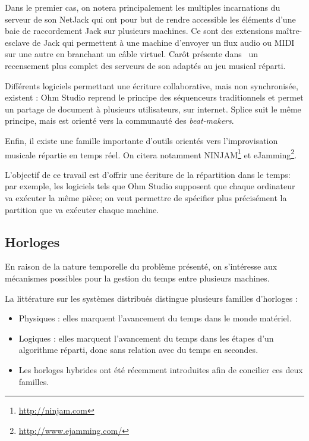 \documentclass[10pt]{article}
\begin{document}
Dans le premier cas, on notera principalement les multiples incarnations du serveur de son NetJack\cite{carot2009netjack} qui ont pour but de rendre accessible les éléments d'une baie de raccordement Jack sur plusieurs machines. 
Ce sont des extensions maître-esclave de Jack qui permettent à une machine d'envoyer un flux audio ou MIDI sur une autre en branchant un câble virtuel.
Carôt présente dans~\cite{carot2007networked} un recensement plus complet des serveurs de son adaptés au jeu musical réparti.

Différents logiciels permettant une écriture collaborative, mais non synchronisée, existent : 
Ohm Studio\cite{koszolko2015crowdsourcing} reprend le principe des séquenceurs traditionnels et permet un partage de document à plusieurs utilisateurs, sur internet.
Splice\cite{pignato2015deterritorialized} suit le même principe, mais est orienté vers la communauté des \emph{beat-makers}.

Enfin, il existe une famille importante d'outils orientés vers l'improvisation musicale répartie en temps réel\cite{mills2010dislocated}. 
On citera notamment NINJAM\footnote{\url{http://ninjam.com}} et eJamming\footnote{\url{http://www.ejamming.com/}}.

L'objectif de ce travail est d'offrir une écriture de la répartition dans le temps: par exemple, les logiciels tels que Ohm Studio supposent 
que chaque ordinateur va exécuter la même pièce; on veut permettre de spécifier plus précisément la partition que va exécuter chaque machine. 

\subsection{Horloges}
En raison de la nature temporelle du problème présenté, on s'intéresse aux mécanismes possibles pour la gestion du temps entre plusieurs machines.

La littérature sur les systèmes distribués distingue plusieurs familles d'horloges : 
\begin{itemize}
    \item Physiques : elles marquent l'avancement du temps dans le monde matériel.
    \item Logiques : elles marquent l'avancement du temps dans les étapes d'un algorithme réparti, donc sans relation avec du temps en secondes.
    \item Les horloges hybrides ont été récemment introduites afin de concilier ces deux familles.
\end{itemize}
\end{document}
